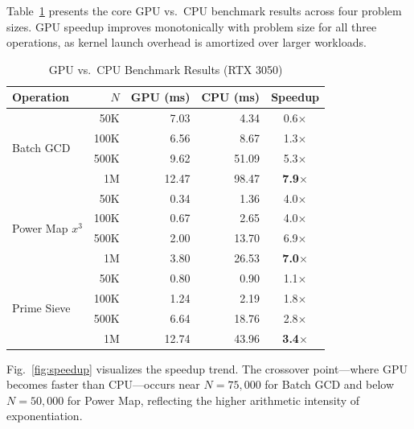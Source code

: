 \documentclass[lettersize,journal]{IEEEtran}
\begin{document}
Table~\ref{tab:benchmark} presents the core GPU vs.\ CPU benchmark results across four problem sizes. GPU speedup improves monotonically with problem size for all three operations, as kernel launch overhead is amortized over larger workloads.

\begin{table}[!t]
\caption{GPU vs.\ CPU Benchmark Results (RTX 3050)\label{tab:benchmark}}
\centering
\begin{tabular}{@{}lrrrc@{}}
\toprule
\textbf{Operation} & \textbf{$N$} & \textbf{GPU (ms)} & \textbf{CPU (ms)} & \textbf{Speedup} \\
\midrule
\multirow{4}{*}{Batch GCD}
 & 50K   & 7.03  & 4.34   & 0.6$\times$ \\
 & 100K  & 6.56  & 8.67   & 1.3$\times$ \\
 & 500K  & 9.62  & 51.09  & 5.3$\times$ \\
 & 1M    & 12.47 & 98.47  & \textbf{7.9$\times$} \\
\midrule
\multirow{4}{*}{Power Map $x^3$}
 & 50K   & 0.34  & 1.36   & 4.0$\times$ \\
 & 100K  & 0.67  & 2.65   & 4.0$\times$ \\
 & 500K  & 2.00  & 13.70  & 6.9$\times$ \\
 & 1M    & 3.80  & 26.53  & \textbf{7.0$\times$} \\
\midrule
\multirow{4}{*}{Prime Sieve}
 & 50K   & 0.80  & 0.90   & 1.1$\times$ \\
 & 100K  & 1.24  & 2.19   & 1.8$\times$ \\
 & 500K  & 6.64  & 18.76  & 2.8$\times$ \\
 & 1M    & 12.74 & 43.96  & \textbf{3.4$\times$} \\
\bottomrule
\end{tabular}
\end{table}

Fig.~\ref{fig:speedup} visualizes the speedup trend. The crossover point---where GPU becomes faster than CPU---occurs near $N = 75{,}000$ for Batch GCD and below $N = 50{,}000$ for Power Map, reflecting the higher arithmetic intensity of exponentiation.
\end{document}
